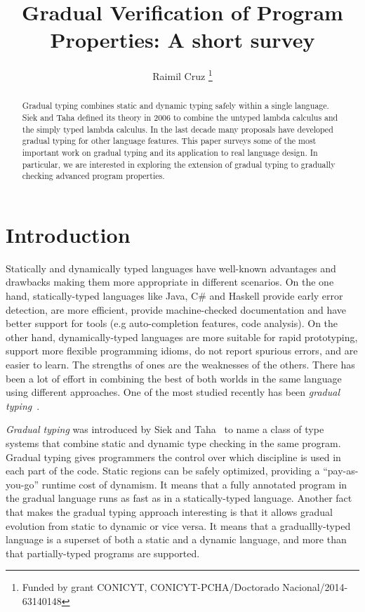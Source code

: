 \documentclass{article}
\title{\bf Gradual Verification of Program Properties: A short survey}
\author{Raimil Cruz
\thanks{Funded by grant CONICYT, CONICYT-PCHA/Doctorado Nacional/2014-63140148}}
\affil{Computer Science Department (DCC), University of Chile, Chile}
\date{}
\newcommand{\quotes}[1]{``#1''}
\begin{document}
	\maketitle
	\renewcommand{\abstractname}{Abstract}	
	\begin{abstract}
	Gradual typing combines static and dynamic typing safely within a single language. Siek and Taha  defined its theory in 2006 to combine the untyped lambda calculus and the simply typed lambda calculus. In the last decade many proposals have developed gradual typing for other language features. This paper surveys some of the most important work on gradual typing and its application to real language design. In particular, we are interested in exploring the extension of gradual typing to gradually checking advanced program properties.
	\end{abstract}	
\section{Introduction}
Statically and dynamically typed languages have well-known advantages and drawbacks making them more appropriate in different scenarios. On the one hand, statically-typed languages like Java, C\# and Haskell provide early error detection, are more efficient, provide machine-checked documentation and  have better support for tools (e.g auto-completion features, code analysis). On the other hand, dynamically-typed languages are more suitable for rapid prototyping, support more flexible programming idioms, do not report spurious errors, and are easier to learn. The strengths of ones are the weaknesses of the others. There has been a lot of effort in combining the best of both worlds in the same language using different approaches. One of the most studied recently has been \textit{gradual typing}~\cite{siekTaha:sfp2006}. 

\emph{Gradual typing} was introduced by Siek and Taha~\cite{siekTaha:sfp2006} to name a class of type systems that combine static and dynamic type checking in the same program. Gradual typing gives programmers the control over which discipline is used in each part of the code. Static regions can be safely optimized, providing a \quotes{pay-as-you-go} runtime cost of dynamism. It means that a fully  annotated program in the gradual language runs as fast as in a statically-typed language. Another fact that makes the gradual typing approach interesting is that it allows gradual evolution from static to dynamic or vice versa.  It means that a graduallly-typed language is a superset of both a static and a dynamic language, and more than that partially-typed programs are supported. 
\end{document}
